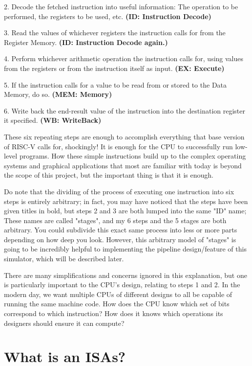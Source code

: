 \documentclass[12pt,twoside]{reedthesis}
\begin{document}
2. Decode the fetched instruction into useful information: The operation to be performed, the registers to be used, etc. \textbf{(ID: Instruction Decode)}

3. Read the values of whichever registers the instruction calls for from the Register Memory. \textbf{(ID: Instruction Decode again.)}

4. Perform whichever arithmetic operation the instruction calls for, using values from the registers or from the instruction itself as input. \textbf{(EX: Execute)}

5. If the instruction calls for a value to be read from or stored to the Data Memory, do so. \textbf{(MEM: Memory)}

6. Write back the end-result value of the instruction into the destination register it specified. \textbf{(WB: WriteBack)}

These six repeating steps are enough to accomplish everything that base version of RISC-V calls for, shockingly! It is enough for the CPU to successfully run low-level programs. How these simple instructions build up to the complex operating systems and graphical applications that most are familiar with today is beyond the scope of this project, but the important thing is that it is enough.

Do note that the dividing of the process of executing one instruction into six steps is entirely arbitrary; in fact, you may have noticed that the steps have been given titles in bold, but steps 2 and 3 are both lumped into the same "ID" name; These names are called "stages", and my 6 steps and the 5 stages are both arbitrary. You could subdivide this exact same process into less or more parts depending on how deep you look. However, this arbitrary model of "stages" is going to be incredibly helpful to implementing the pipeline design/feature of this simulator, which will be described later.

There are many simplifications and concerns ignored in this explanation, but one is particularly important to the CPU's design, relating to steps 1 and 2. In the modern day, we want multiple CPUs of different designs to all be capable of running the same machine code. How does the CPU know which set of bits correspond to which instruction? How does it knows which operations its designers should ensure it can compute?

\section{What is an ISAs?}
\end{document}
